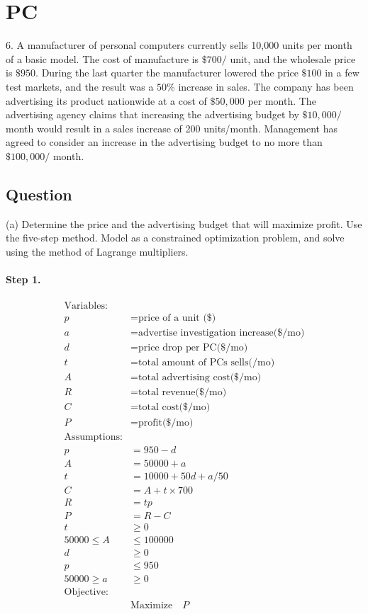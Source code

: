 \documentclass[11pt]{article}
\begin{document}
\section{PC}
6. A manufacturer of personal computers currently sells 10,000 units per month of a basic model. The cost of manufacture is $\$ 700 /$ unit, and the wholesale price is $\$ 950$. During the last quarter the manufacturer lowered the price $\$ 100$ in a few test markets, and the result was a $50 \%$ increase in sales. The company has been advertising its product nationwide at a cost of $\$ 50,000$ per month. The advertising agency claims that increasing the advertising budget by $\$ 10,000 /$ month would result in a sales increase of 200 units/month. Management has agreed to consider an increase in the advertising budget to no more than $\$ 100,000 /$ month.
\subsection{Question}
(a) Determine the price and the advertising budget that will maximize profit. Use the five-step method. Model as a constrained optimization problem, and solve using the method of Lagrange multipliers.
 
\paragraph{Step 1.}
$$
\begin{aligned}
	\text{Variables:}\\
	p &= \text{price of a unit (\$)}\\
	a &= \text{advertise investigation increase(\$/mo)}\\
	d &= \text{price drop per PC(\$/mo)}\\
	t &= \text{total amount of PCs sells(/mo)}\\
	A &= \text{total advertising cost(\$/mo)}\\
	R &= \text{total revenue(\$/mo)}\\
	C &= \text{total cost(\$/mo)}\\
	P &= \text{profit(\$/mo)}\\
	\text{Assumptions:}\\
	p &= 950 - d\\
	A &= 50000 + a\\
	t &= 10000 + 50d + a/50  \\
	C &= A +  t\times 700\\
	R &= tp\\
	P &= R - C\\
	t & \geq 0 \\
	50000\leq A&\leq 100000\\
	d & \geq 0\\
	p & \leq 950\\
	50000\geq a & \geq 0\\
	\text{Objective:}\\
	&\text{Maximize}  \quad  P 
\end{aligned}
$$
\end{document}

